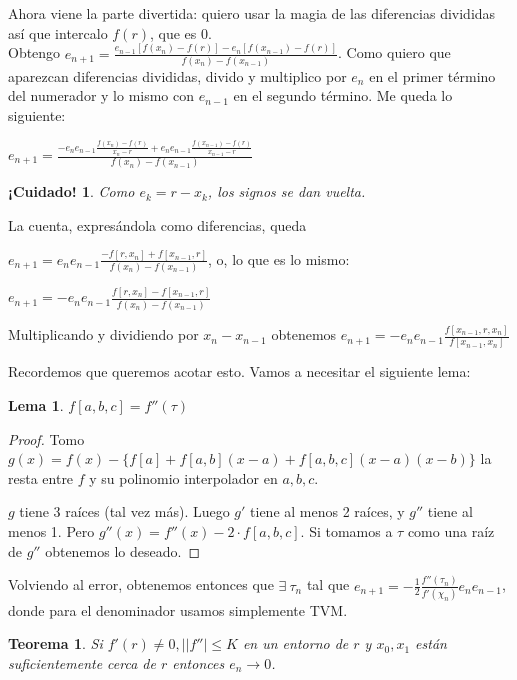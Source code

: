 \documentclass[10pt,a4paper,final]{report}
\newtheorem{theorem}{Teorema}
\newtheorem{lemma}{Lema}
\newtheorem{caution}{¡Cuidado!}
\begin{document}
{%
Ahora viene la parte divertida: quiero usar la magia de las diferencias divididas así que intercalo $f(r)$, que es $0$.\\

Obtengo $e_{n+1} = \frac{ e_{n-1} [f(x_n) - f(r)]- e_n [f(x_{n-1}) - f(r)] }{f(x_n) - f(x_{n-1})}$. Como quiero que aparezcan diferencias divididas, divido y multiplico por $e_n$ en el primer término del numerador y lo mismo con $e_{n-1}$ en el segundo término. Me queda lo siguiente:

$e_{n+1} = \frac{ -e_n e_{n-1} \frac{f(x_n) - f(r)}{x_n-r}+ e_n e_{n-1} \frac{f(x_{n-1}) - f(r)}{x_{n-1}-r} }{f(x_n) - f(x_{n-1})}$\\

\begin{caution}
Como $e_k = r - x_k$, los signos se dan vuelta.
\end{caution}

La cuenta, expresándola como diferencias, queda 

 $e_{n+1} = e_n e_{n-1} \frac{-f[r, x_n] + f[x_{n-1},r]}{f(x_n) - f(x_{n-1})}$, o, lo que es lo mismo:
 
 $e_{n+1} = - e_n e_{n-1} \frac{f[r, x_n] - f[x_{n-1},r]}{f(x_n) - f(x_{n-1})}$
 
 Multiplicando y dividiendo por $x_n - x_{n-1}$ obtenemos $e_{n+1} = - e_n e_{n-1} \frac{f[x_{n-1},r,x_n]}{f[x_{n-1},x_n]}$

Recordemos que queremos acotar esto. Vamos a necesitar el siguiente lema:

\begin{lemma}
	$f[a,b,c] = f''(\tau)$ 
\end{lemma}

\begin{proof}
	Tomo $g(x) = f(x) - \{f[a] + f[a,b] (x-a) + f[a,b,c] (x-a) (x-b) \}$ la resta entre $f$ y su polinomio interpolador en $a,b,c$.
	
	$g$ tiene 3 raíces (tal vez más). Luego $g'$ tiene al menos 2 raíces, y $g''$ tiene al menos 1. Pero $g''(x) = f''(x) - 2\cdot f[a,b,c]$. Si tomamos a $\tau$ como una raíz de $g''$ obtenemos lo deseado.
\end{proof}

Volviendo al error, obtenemos entonces que $\exists\ \tau_n$ tal que $e_{n+1} = -\frac{1}{2}
\frac{f''(\tau_n)}{f'(\chi_n)} e_n e_{n-1}$, donde para el denominador usamos simplemente TVM.


\begin{theorem}
	Si $f'(r) \neq 0, ||f''|\leq K$ en un entorno de $r$ y $x_0,x_1$ están suficientemente cerca de $r$ entonces $e_n \to 0$.
\end{theorem}

}
\end{document}
